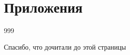 \documentclass[a5paper,10pt,openany]{book}
\begin{document}






\backmatter


\part*{Приложения}



%

%
%
%
%
%


\begin{thebibliography}{999}

\end{thebibliography}




\newpage

\pagestyle{empty}

\clearpage
{}
\begin{center}
\begin{minipage}{\textwidth}
\begin{center}Спасибо, что дочитали до этой страницы\end{center}
\end{minipage}
\end{center}
\clearpage
\end{document}
